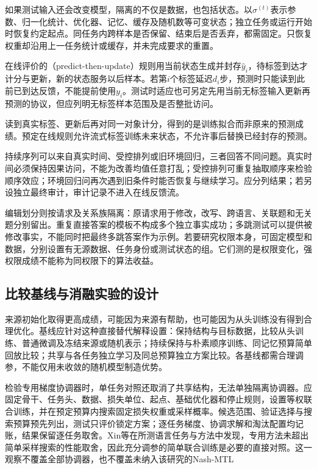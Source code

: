 如果测试输入还会改变模型，隔离的不仅是数据，也包括状态。以$\sigma^{(t)}$表示参数、归一化统计、优化器、记忆、缓存及随机数等可变状态；独立任务或运行开始时恢复约定起点。同任务内跨样本是否保留、结束后是否丢弃，都需固定。只恢复权重却沿用上一任务统计或缓存，并未完成要求的重置。

在线评价的（predict-then-update）规则用当前状态生成并封存$\hat y_i$，待标签到达才计分与更新，新的状态服务以后样本。若第$i$个标签延迟$d_i$步，预测时只能读到此前已到达反馈，不能提前使用$y_i$。测试时适应也可另定先用当前无标签输入更新再预测的协议，但应列明无标签样本范围及是否整批访问。

读到真实标签、更新后再对同一对象计分，得到的是训练拟合而非原来的预测成绩。预定在线规则允许流式标签训练未来状态，不允许事后替换已经封存的预测。

持续序列可以来自真实时间、受控排列或旧环境回归，三者回答不同问题。真实时间必须保持因果访问，不能为改善均值任意打乱；受控排列可重复抽取顺序来检验顺序效应；环境回归问再次遇到旧条件时能否恢复与继续学习。应分列结果；若另设独立最终审计，审计记录不进入在线反馈流。

编辑划分则按请求及关系族隔离：原请求用于修改，改写、跨语言、关联题和无关题分别留出。重复直接答案的模板不构成多个独立事实成功；多跳测试可以提供被修改事实，不能同时把最终多跳答案作为示例。若要研究权限本身，可固定模型和数据，分别设置有无源数据、任务身份或测试状态的组。它们测的是权限变化，强权限成绩不能称为同权限下的算法收益。

\subsection{比较基线与消融实验的设计}
\label{sec:ket-evaluation-baselines}

来源初始化取得更高成绩，可能因为来源有帮助，也可能因为从头训练没有得到合理优化。基线应针对这种直接替代解释设置：保持结构与目标数据，比较从头训练、普通微调及冻结来源或随机表示；持续保持与朴素顺序训练、同记忆预算简单回放比较；共享与各任务独立学习及同总预算独立方案比较。各基线都需合理调参，不能仅用未收敛的随机模型制造优势。

检验专用梯度协调器时，单任务对照还取消了共享结构，无法单独隔离协调器。应固定骨干、任务头、数据、损失单位、起点、基础优化器和停止规则，设置等权联合训练，并在预定预算内搜索固定损失权重或采样概率。候选范围、验证选择与搜索预算预先列出，测试只评价锁定方案；逐任务梯度、协调求解和淘汰配置均记账，结果保留逐任务取舍。Xin等在所测语言任务与方法中发现，专用方法未超出简单采样搜索的性能取舍，因此充分调参的简单联合训练是必要的直接对照。这一观察不覆盖全部协调器，也不覆盖未纳入该研究的Nash-MTL

